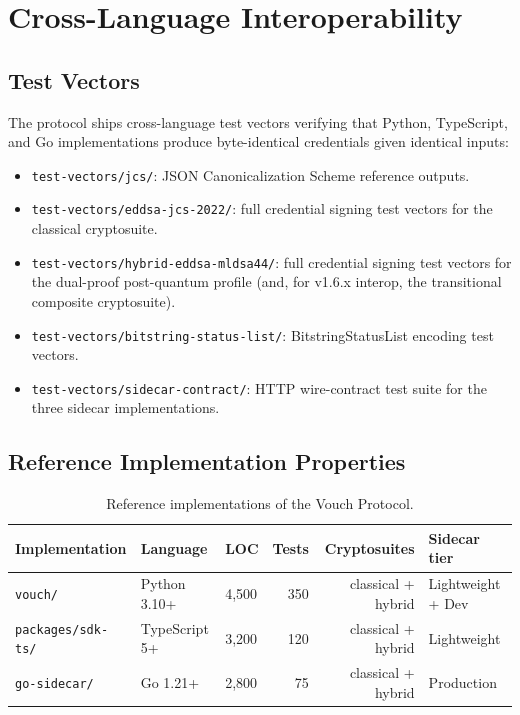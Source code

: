 \documentclass[11pt,a4paper,twocolumn]{article}
\begin{document}
\section{Cross-Language Interoperability}
\label{sec:interop}

\subsection{Test Vectors}

The protocol ships cross-language test vectors verifying that Python, TypeScript, and Go implementations produce byte-identical credentials given identical inputs:

\begin{itemize}[leftmargin=*]
\item \verb|test-vectors/jcs/|: JSON Canonicalization Scheme reference outputs.
\item \verb|test-vectors/eddsa-jcs-2022/|: full credential signing test vectors for the classical cryptosuite.
\item \verb|test-vectors/hybrid-eddsa-mldsa44/|: full credential signing test vectors for the dual-proof post-quantum profile (and, for v1.6.x interop, the transitional composite cryptosuite).
\item \verb|test-vectors/bitstring-status-list/|: BitstringStatusList encoding test vectors.
\item \verb|test-vectors/sidecar-contract/|: HTTP wire-contract test suite for the three sidecar implementations.
\end{itemize}

\subsection{Reference Implementation Properties}

\begin{table}[h]
\centering
\small
\begin{tabular}{lllrrl}
\toprule
Implementation & Language & LOC & Tests & Cryptosuites & Sidecar tier \\
\midrule
\verb|vouch/| & Python 3.10+ & 4{,}500 & 350 & classical + hybrid & Lightweight + Dev \\
\verb|packages/sdk-ts/| & TypeScript 5+ & 3{,}200 & 120 & classical + hybrid & Lightweight \\
\verb|go-sidecar/| & Go 1.21+ & 2{,}800 & 75 & classical + hybrid & Production \\
\bottomrule
\end{tabular}
\caption{Reference implementations of the Vouch Protocol.}
\end{table}
\end{document}
